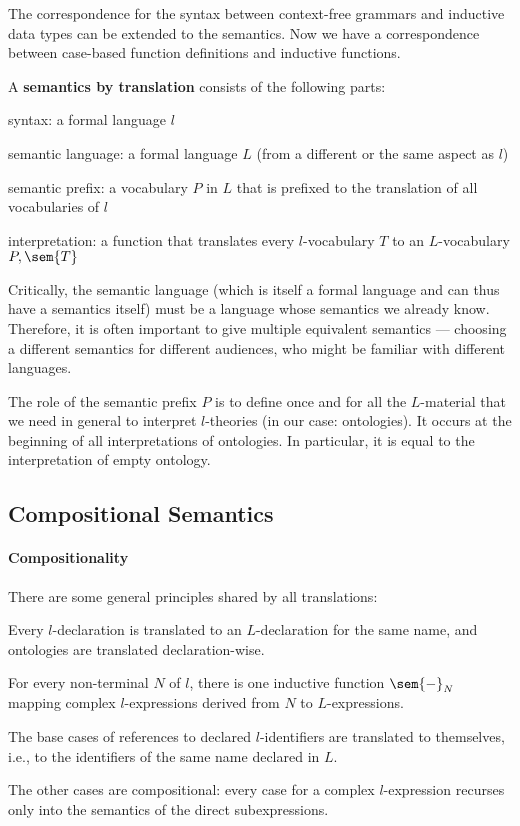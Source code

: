 The correspondence for the syntax between context-free grammars and inductive data types can be extended to the semantics.
Now we have a correspondence between case-based function definitions and inductive functions.

\begin{definition}
A \textbf{semantics by translation} consists of the following parts:
\begin{compactitem}
 \item syntax: a formal language $l$
 \item semantic language: a formal language $L$ (from a different or the same aspect as $l$)
 \item semantic prefix: a vocabulary $P$ in $L$ that is prefixed to the translation of all vocabularies of $l$
 \item interpretation: a function that translates every $l$-vocabulary $T$ to an $L$-vocabulary $P,\sem{T}$
\end{compactitem}
\end{definition}

Critically, the semantic language (which is itself a formal language and can thus have a semantics itself) must be a language whose semantics we already know.
Therefore, it is often important to give multiple equivalent semantics --- choosing a different semantics for different audiences, who might be familiar with different languages.

The role of the semantic prefix $P$ is to define once and for all the $L$-material that we need in general to interpret $l$-theories (in our case: ontologies).
It occurs at the beginning of all interpretations of ontologies.
In particular, it is equal to the interpretation of empty ontology.

\subsection{Compositional Semantics}

\paragraph{Compositionality}
There are some general principles shared by all translations:
\begin{compactitem}
 \item Every $l$-declaration is translated to an $L$-declaration for the same name, and ontologies are translated declaration-wise.
 \item For every non-terminal $N$ of $l$, there is one inductive function $\sem{-}_N$ mapping complex $l$-expressions derived from $N$ to $L$-expressions.
 \item The base cases of references to declared $l$-identifiers are translated to themselves, i.e., to the identifiers of the same name declared in $L$.
 \item The other cases are compositional: every case for a complex $l$-expression recurses only into the semantics of the direct subexpressions.
\end{compactitem}


